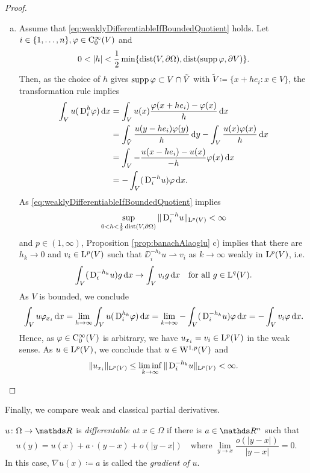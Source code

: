 \begin{proof}
\begin{enumerate}[a)]
    \item Assume that \eqref{eq:weaklyDifferentiableIfBoundedQuotient} holds.
      Let $i \in \{1,\dots,n\}, \varphi \in \mathrm{C}_0^\infty(V)$ and 
      $$
      0 < |h| < \frac{1}{2} \min\{ \operatorname{dist}(V,\partial\Omega), \operatorname{dist}(\operatorname{supp} \varphi, \partial V)\}.$$
      Then, as the choice of $h$ gives $\operatorname{supp} \varphi \subset V \cap \tilde V$ with $\tilde V \coloneqq \{ x + he_i \colon x \in V \}$, the transformation rule implies
      \begin{align*}
        \int_V u(\,{\operatorname{D}}_i^h \varphi)\, {\operatorname{d}\!{x}}
        &= \int_V u(x) \frac{\varphi(x + he_i) - \varphi(x)}{h} \, {\operatorname{d}\!{x}} \\
        &= \int_{\tilde V} \frac{u(y - h e_i)\varphi(y)}{h} \, {\operatorname{d}\!{y}} - \int_V \frac{u(x) \varphi(x)}{h} \, {\operatorname{d}\!{x}} \\
        &= \int_V - \frac{u(x - he_i) - u(x)}{-h} \varphi(x) \, {\operatorname{d}\!{x}} \\
        &= - \int_V (\,{\operatorname{D}}_i^{-h} u) \varphi \, {\operatorname{d}\!{x}}.
      \end{align*}
      As \eqref{eq:weaklyDifferentiableIfBoundedQuotient} implies
      $$
      \sup_{0 < h < \frac{1}{2} \operatorname{dist}(V, \partial\Omega)} \|\,{\operatorname{D}}_i^{-h} u\|_{\mathrm{L}^p(V)} < \infty
      $$
      and $p \in (1,\infty)$, Proposition \ref{prop:banachAlaoglu} c) implies that there are $h_k \to 0$ and $v_i \in \mathrm{L}^p(V)$ such that $\DD_i^{-h_k} u \rightharpoonup v_i$ as $k \to \infty$ weakly in $\mathrm{L}^p(V)$, i.e.
      \begin{equation}
        \label{eq:weakConvergenceInLp}
        \int_V (\,{\operatorname{D}}_i^{-h_k} u) g \, {\operatorname{d}\!{x}} \to \int_V v_i g \, {\operatorname{d}\!{x}} \quad\text{for all } g \in \mathrm{L}^q(V).
      \end{equation}
      As $V$ is bounded, we conclude
      $$
        \int_V u \varphi_{x_i} \, {\operatorname{d}\!{x}}
        = \lim_{h \to \infty} \int_V u( \,{\operatorname{D}}_i^{h_k} \varphi ) \, {\operatorname{d}\!{x}}
        = \lim_{k \to \infty} - \int_V ( \,{\operatorname{D}}_i^{-h_k} u) \varphi \, {\operatorname{d}\!{x}}
        = - \int_V v_i \varphi \, {\operatorname{d}\!{x}}.
      $$
      Hence, as $\varphi \in \mathrm{C}_0^\infty(V)$ is arbitrary, we have $u_{x_i} = v_i \in \mathrm{L}^p(V)$ in the weak sense.
      As $u \in \mathrm{L}^p(V)$, we conclude that $u \in \mathrm{W}^{1,p}(V)$ and
      \[
      \|u_{x_i}\|_{\mathrm{L}^p(V)} \leq \liminf_{k \to \infty} \|\,{\operatorname{D}}_i^{-h_k} u \|_{\mathrm{L}^p(V)} < \infty. \qedhere
    \]
  \end{enumerate}
\end{proof}

Finally, we compare weak and classical partial derivatives.

\begin{defn}
  $u \colon \Omega \to \R$ is \emph{differentable at $x \in \Omega$} if there is $a \in \R^n$ such that 
  $$
  u(y) = u(x) + a \cdot (y - x) + o(|y - x|) \quad\text{where } \lim_{y \to x} \frac{o(|y - x|)}{|y - x|} = 0.
  $$
  In this case, $\nabla u(x) \coloneqq a$ is called the \emph{gradient of $u$}.
\end{defn}

